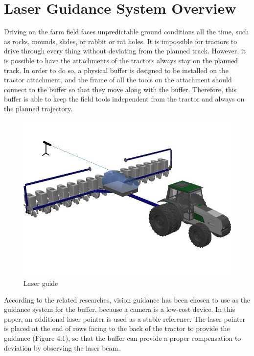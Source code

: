 \documentclass[letterpaper,12pt,oneside]{book}
\begin{document}
		\section{Laser Guidance System Overview}
		Driving on the farm field faces unpredictable ground conditions all the time, such as rocks, mounds, slides, or rabbit or rat holes. It is impossible for tractors to drive through every thing without deviating from the planned track. However, it is possible to have the attachments of the tractors always stay on the planned track. In order to do so, a physical buffer is designed to be installed on the tractor attachment, and the frame of all the tools on the attachment should connect to the buffer so that they move along with the buffer. Therefore, this buffer is able to keep the field tools independent from the tractor and always on the planned trajectory.
		\begin{figure}[ht!]
			\begin{center}
				\includegraphics[scale = 0.6]{tractor.jpg}
				\caption{Laser guide}
			\end{center}
		\end{figure}
		
		According to the related researches, vision guidance has been chosen to use as the guidance system for the buffer, because a camera is a low-cost device. In this paper, an additional laser pointer is used as a stable reference. The laser pointer is placed at the end of rows facing to the back of the tractor to provide the guidance (Figure 4.1), so that the buffer can provide a proper compensation to deviation by observing the laser beam. 
		
\end{document}
